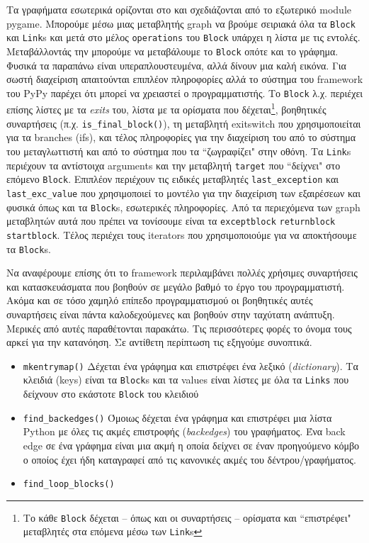 Τα γραφήματα εσωτερικά ορίζονται στο  και
σχεδιάζονται από το εξωτερικό module pygame. Μπορούμε μέσω μιας μεταβλητής graph
να βρούμε σειριακά όλα τα \texttt{Block} και \texttt{Link}s και μετά στο μέλος
\texttt{operations} του \texttt{Block} υπάρχει η λίστα με τις εντολές.
Μεταβάλλοντάς την μπορούμε να μεταβάλουμε το \texttt{Block} οπότε και το
γράφημα. Φυσικά τα παραπάνω είναι υπεραπλουστευμένα, αλλά δίνουν μια καλή
εικόνα. Για σωστή διαχείριση απαιτούνται επιπλέον πληροφορίες αλλά το σύστημα
του framework του PyPy παρέχει ότι μπορεί να χρειαστεί ο προγραμματιστής. Το
\texttt{Block} λ.χ. περιέχει επίσης λίστες με τα \textit{exits} του, λίστα με τα
ορίσματα που δέχεται\footnote{Το κάθε \texttt{Block} δέχεται – όπως και οι
συναρτήσεις – ορίσματα και ``επιστρέφει" μεταβλητές στα επόμενα μέσω των
\texttt{Link}s}, βοηθητικές συναρτήσεις (π.χ. \texttt{is\_final\_block()}), τη
μεταβλητή exitswitch που χρησιμοποιείται για τα branches (ifs), και τέλος
πληροφορίες για την διαχείριση του από το σύστημα του μεταγλωττιστή και από το
σύστημα που τα ``ζωγραφίζει" στην οθόνη. Τα \texttt{Link}s περιέχουν τα
αντίστοιχα arguments και την μεταβλητή \texttt{target} που ``δείχνει" στο επόμενο
\texttt{Block}. Επιπλέον περιέχουν τις ειδικές μεταβλητές
\texttt{last\_exception} και \texttt{last\_exc\_value} που χρησιμοποιεί το
μοντέλο για την διαχείριση των εξαιρέσεων και φυσικά όπως και τα
\texttt{Block}s, εσωτερικές πληροφορίες. Από τα περιεχόμενα των graph μεταβλητών
αυτά που πρέπει να τονίσουμε είναι τα \texttt{exceptblock} \texttt{returnblock}
\texttt{startblock}. Τέλος περιέχει τους iterators που χρησιμοποιούμε για να
αποκτήσουμε τα \texttt{Block}s.

Να αναφέρουμε επίσης ότι το framework περιλαμβάνει πολλές χρήσιμες συναρτήσεις
και κατασκευάσματα που βοηθούν σε μεγάλο βαθμό το έργο του προγραμματιστή. Ακόμα
και σε τόσο χαμηλό επίπεδο προγραμματισμού οι βοηθητικές αυτές συναρτήσεις είναι
πάντα καλοδεχούμενες και βοηθούν στην ταχύτατη ανάπτυξη. Μερικές από αυτές
παραθέτονται παρακάτω. Τις περισσότερες φορές το όνομα τους αρκεί για την
κατανόηση. Σε αντίθετη περίπτωση τις εξηγούμε συνοπτικά.

\begin{itemize}

\item \texttt{mkentrymap()} Δέχεται ένα γράφημα και επιστρέφει ένα λεξικό
(\textit{dictionary}). Τα κλειδιά (keys) είναι τα \texttt{Block}s και τα values
είναι λίστες με όλα τα \texttt{Links} που δείχνουν στο εκάστοτε \texttt{Block}
του κλειδιού

\item \texttt{find\_backedges()} Όμοιως δέχεται ένα γράφημα και επιστρέφει μια
λίστα Python με όλες τις ακμές επιστροφής (\textit{backedges}) του γραφήματος.
Ένα back edge σε ένα γράφημα είναι μια ακμή η οποία δείχνει σε έναν προηγούμενο
κόμβο ο οποίος έχει ήδη καταγραφεί από τις κανονικές ακμές του
δέντρου/γραφήματος.

\item \texttt{find\_loop\_blocks()}

\end{itemize}


